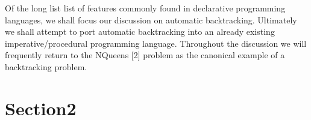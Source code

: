 Of the long list list of features commonly found in declarative programming languages, we shall focus our discussion on automatic backtracking. Ultimately we shall attempt to port automatic backtracking into an already existing imperative/procedural programming language. Throughout the discussion we will frequently return to the NQueens [2] problem as the canonical example of a backtracking problem.

\section{Section2}